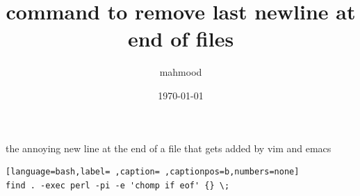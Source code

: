\documentclass[a4paper,12pt]{article}
\author{mahmood}
\date{\today}
\title{command to remove last newline at end of files}
\begin{document}
\maketitle
the annoying new line at the end of a file that gets added by vim and emacs\\[0pt]
\begin{lstlisting}[language=bash,label= ,caption= ,captionpos=b,numbers=none]
find . -exec perl -pi -e 'chomp if eof' {} \;
\end{lstlisting}
\end{document}
